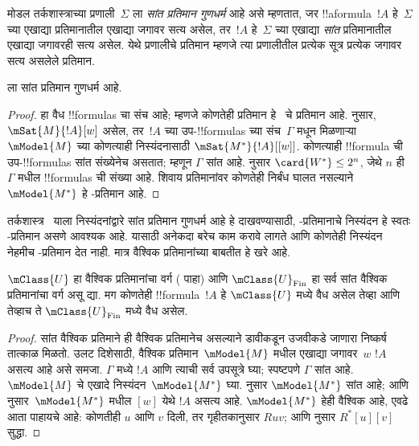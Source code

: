 \documentclass[../../../include/open-logic-section]{subfiles}
\begin{document}


\begin{defn}
  मोडल तर्कशास्त्राच्या प्रणाली~$\Sigma$ ला
  \emph{सांत प्रतिमान गुणधर्म} आहे असे म्हणतात, जर
  !!a{formula}~$!A$ हे~$\Sigma$ च्या एखाद्या
  प्रतिमानातील एखाद्या जगावर सत्य असेल, तर~$!A$
  हे~$\Sigma$ च्या एखाद्या \emph{सांत} प्रतिमानातील
  एखाद्या जगावरही सत्य असेल. येथे प्रणालीचे प्रतिमान म्हणजे
  त्या प्रणालीतील प्रत्येक सूत्र प्रत्येक जगावर सत्य असलेले प्रतिमान.
\end{defn}

\begin{prop}
   ला सांत प्रतिमान गुणधर्म आहे.
\end{prop}

\begin{proof}
   हा वैध !!{formula}s चा संच आहे;
  म्हणजे कोणतेही प्रतिमान हे~ चे प्रतिमान आहे.
   नुसार,
  $\mSat{M}{!A}[w]$ असेल, तर~$!A$ च्या
  उप-!!{formula}s च्या संच~$\Gamma$ मधून मिळणाऱ्या
  $\mModel{M}$ च्या कोणत्याही निस्यंदनासाठी
  $\mSat{M^*}{!A}[{[w]}]$. कोणत्याही !!{formula}
  ची उप-!!{formula}s सांत संख्येनेच असतात; म्हणून
  $\Gamma$ सांत आहे. 
  नुसार $\card{W^*} \le 2^n$, जेथे $n$ ही~$\Gamma$
  मधील !!{formula}s ची संख्या आहे. शिवाय 
  प्रतिमानांवर कोणतेही निर्बंध घालत नसल्याने
  $\mModel{M^*}$ हे -प्रतिमान आहे.
\end{proof}

तर्कशास्त्र~ याला निस्यंदनांद्वारे
सांत प्रतिमान गुणधर्म आहे हे दाखवण्यासाठी,
-प्रतिमानाचे निस्यंदन हे स्वतः
-प्रतिमान असणे आवश्यक आहे. यासाठी
अनेकदा बरेच काम करावे लागते आणि कोणतेही
निस्यंदन नेहमीच -प्रतिमान देत नाही.
मात्र वैश्विक प्रतिमानांच्या बाबतीत हे खरे आहे.

\begin{prop}
  $\mClass{U}$ हा वैश्विक प्रतिमानांचा वर्ग
  ( पाहा) आणि
  $\mClass{U}_\mathrm{Fin}$ हा सर्व सांत वैश्विक
  प्रतिमानांचा वर्ग असू द्या. मग कोणतेही
  !!{formula}~$!A$ हे $\mClass{U}$ मध्ये वैध असेल
  तेव्हा आणि तेव्हाच ते $\mClass{U}_\mathrm{Fin}$
  मध्ये वैध असेल.
\end{prop}

\begin{proof}
  सांत वैश्विक प्रतिमाने ही वैश्विक प्रतिमानेच
  असल्याने डावीकडून उजवीकडे जाणारा निष्कर्ष
  तात्काळ मिळतो. उलट दिशेसाठी, वैश्विक
  प्रतिमान~$\mModel{M}$ मधील एखाद्या जगावर~$w$
  $!A$ असत्य आहे असे समजा. $\Gamma$ मध्ये $!A$
  आणि त्याची सर्व उपसूत्रे घ्या; स्पष्टपणे $\Gamma$
  सांत आहे. $\mModel{M}$ चे एखादे निस्यंदन~$\mModel{M^*}$
  घ्या.  नुसार
  $\mModel{M^*}$ सांत आहे; आणि
   नुसार~$\mModel{M^*}$
  मधील $[w]$ येथे $!A$ असत्य आहे. $\mModel{M^*}$
  हेही वैश्विक आहे, एवढे आता पाहायचे आहे:
  कोणतीही $u$ आणि $v$ दिली, तर गृहीतकानुसार
  $Ruv$; आणि
  नुसार $R^*[u][v]$ सुद्धा.
\end{proof}
\end{document}
